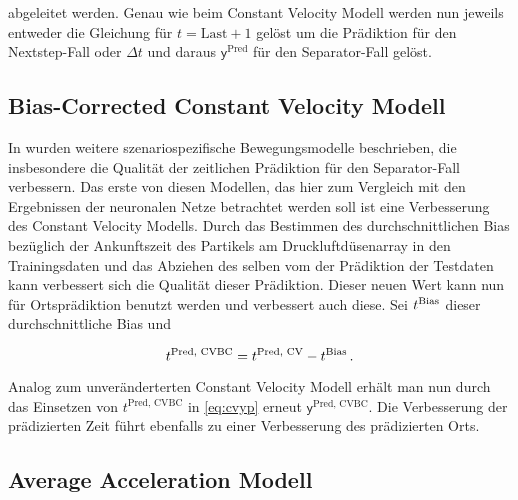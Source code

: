 abgeleitet werden.
Genau wie beim Constant Velocity Modell werden nun jeweils entweder die Gleichung für \(t = \text{Last} + 1\) gelöst 
um die Prädiktion für den Nextstep-Fall oder \(\Delta t \) und daraus \(\mathsf{y}^{\text{Pred}}\) für den Separator-Fall gelöst.


\subsection{Bias-Corrected Constant Velocity Modell}

In \cite{Pfaff2018} wurden weitere szenariospezifische Bewegungsmodelle beschrieben, die insbesondere die Qualität der zeitlichen Prädiktion für den Separator-Fall verbessern.
Das erste von diesen Modellen, das hier zum Vergleich mit den Ergebnissen der neuronalen Netze betrachtet werden soll ist eine Verbesserung des Constant Velocity Modells.
Durch das Bestimmen des durchschnittlichen Bias bezüglich der Ankunftszeit des Partikels am Druckluftdüsenarray in den Trainingsdaten und das Abziehen des selben vom der Prädiktion der Testdaten kann verbessert sich die Qualität dieser Prädiktion.
Dieser neuen Wert kann nun für Ortsprädiktion benutzt werden und verbessert auch diese.
Sei \(t{^{\text{Bias}}}\) dieser durchschnittliche Bias und

\begin{equation*}
    t{^{\text{Pred, CVBC}}} = t{^{\text{Pred, CV}}} - t{^{\text{Bias}}} \, .
\end{equation*}

Analog zum unveränderterten Constant Velocity Modell erhält man nun durch das Einsetzen von \(t^{\text{Pred, CVBC}}\) in \eqref{eq:cvyp} erneut \(\mathsf{y}^{\text{Pred, CVBC}}\).
Die Verbesserung der prädizierten Zeit führt ebenfalls zu einer Verbesserung des prädizierten Orts.


\subsection{Average Acceleration Modell}




